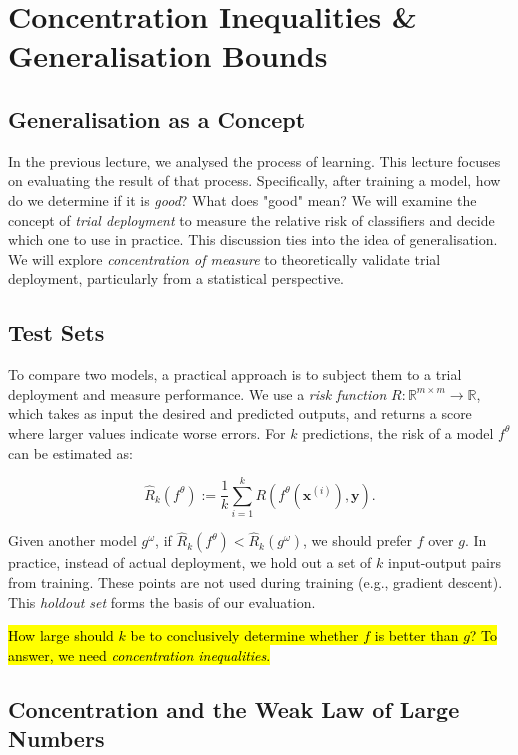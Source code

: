 
\chapter{Concentration Inequalities \& Generalisation Bounds}

\section{Generalisation as a Concept}

In the previous lecture, we analysed the process of learning. This lecture focuses on evaluating the result of that process. Specifically, after training a model, how do we determine if it is \textit{good}? What does "good" mean? We will examine the concept of \textit{trial deployment} to measure the relative risk of classifiers and decide which one to use in practice. This discussion ties into the idea of generalisation. We will explore \textit{concentration of measure} to theoretically validate trial deployment, particularly from a statistical perspective.

\section{Test Sets}

To compare two models, a practical approach is to subject them to a trial deployment and measure performance. We use a \textit{risk function} $R: \mathbb{R}^{m \times m} \to \mathbb{R}$, which takes as input the desired and predicted outputs, and returns a score where larger values indicate worse errors. For $k$ predictions, the risk of a model $f^\theta$ can be estimated as:

\[
    \hat{R}_k(f^\theta) := \frac{1}{k} \sum_{i=1}^k R(f^\theta(\boldsymbol{x}^{(i)}), \boldsymbol{y}).
\]

Given another model $g^\omega$, if $\hat{R}_k(f^\theta) < \hat{R}_k(g^\omega)$, we should prefer $f$ over $g$. In practice, instead of actual deployment, we hold out a set of $k$ input-output pairs from training. These points are not used during training (e.g., gradient descent). This \textit{holdout set} forms the basis of our evaluation.

\hl{How large should $k$ be to conclusively determine whether $f$ is better than $g$? To answer, we need \textit{concentration inequalities}.}

\section{Concentration and the Weak Law of Large Numbers}

